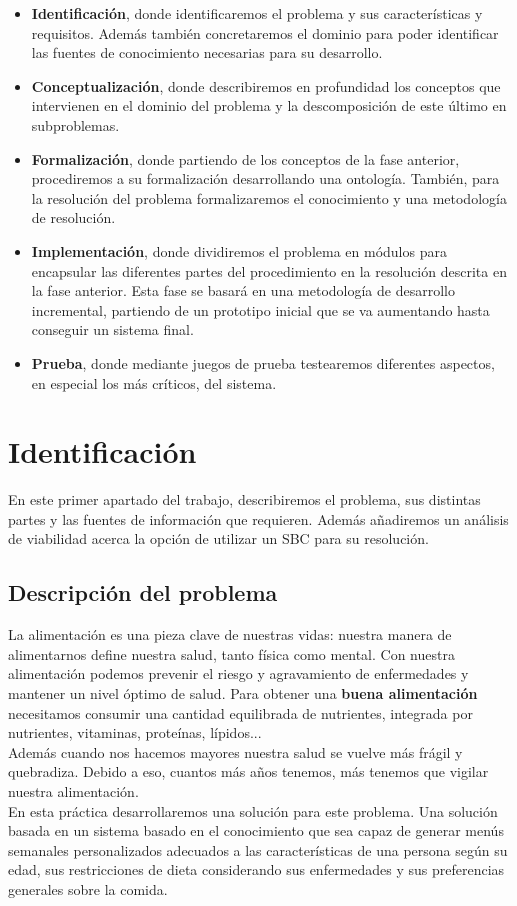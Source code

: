 \documentclass[11]{article}
\begin{document}
\begin{itemize}
	\item \textbf{Identificación}, donde identificaremos el problema y sus características y requisitos. Además también concretaremos el dominio para poder identificar las fuentes de conocimiento necesarias para su desarrollo.%
	\item \textbf{Conceptualización}, donde describiremos en profundidad los conceptos que intervienen en el dominio del problema y la descomposición de este último en subproblemas. %
	\item \textbf{Formalización}, donde partiendo de los conceptos de la fase anterior, procediremos a su formalización desarrollando una ontología. También, para la resolución del problema formalizaremos el conocimiento y una metodología de resolución.
\item \textbf{Implementación}, donde dividiremos el problema en módulos para encapsular las diferentes partes del procedimiento en la resolución descrita en la fase anterior. Esta fase se basará en una metodología de desarrollo incremental, partiendo de un prototipo inicial que se va aumentando hasta conseguir un sistema final. 
\item \textbf{Prueba}, donde mediante juegos de prueba testearemos diferentes aspectos, en especial los más críticos, del sistema. 
\end{itemize}

\section{Identificación}
En este primer apartado del trabajo, describiremos el problema, sus distintas partes y las fuentes de información que requieren. Además añadiremos un análisis de viabilidad acerca la opción de utilizar un SBC para su resolución.

\subsection{Descripción del problema}
La alimentación es una pieza clave de nuestras vidas: nuestra manera de alimentarnos define nuestra salud, tanto física como mental. Con nuestra alimentación podemos prevenir el riesgo y agravamiento de enfermedades y mantener un nivel óptimo de salud. Para obtener una \textbf{buena alimentación} necesitamos consumir una cantidad equilibrada de nutrientes, integrada por nutrientes, vitaminas, proteínas, lípidos...
\\
Además cuando nos hacemos mayores nuestra salud se vuelve más frágil y quebradiza. Debido a eso, cuantos más años tenemos, más tenemos que vigilar nuestra alimentación.
\\
En esta práctica desarrollaremos una solución para este problema. Una solución basada en un sistema basado en el conocimiento que sea capaz de generar menús semanales personalizados adecuados a las características de una persona según su edad, sus restricciones de dieta considerando sus enfermedades y sus preferencias generales sobre la comida.\\
\end{document}
